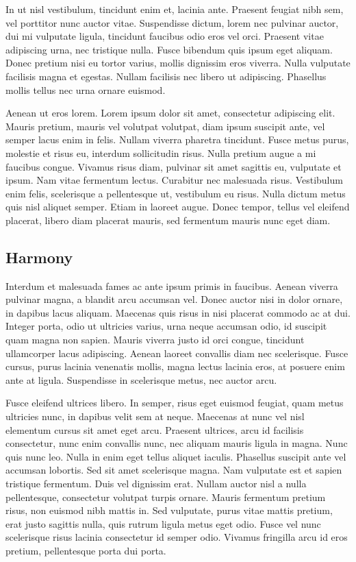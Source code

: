 \documentclass[11pt,a4paper]{memoir}\usepackage[]{graphicx}\usepackage[]{color}
\begin{document}
In ut nisl vestibulum, tincidunt enim et, lacinia ante. Praesent feugiat nibh sem, vel porttitor nunc auctor vitae. Suspendisse dictum, lorem nec pulvinar auctor, dui mi vulputate ligula, tincidunt faucibus odio eros vel orci. Praesent vitae adipiscing urna, nec tristique nulla. Fusce bibendum quis ipsum eget aliquam. Donec pretium nisi eu tortor varius, mollis dignissim eros viverra. Nulla vulputate facilisis magna et egestas. Nullam facilisis nec libero ut adipiscing. Phasellus mollis tellus nec urna ornare euismod.

Aenean ut eros lorem. Lorem ipsum dolor sit amet, consectetur adipiscing elit. Mauris pretium, mauris vel volutpat volutpat, diam ipsum suscipit ante, vel semper lacus enim in felis. Nullam viverra pharetra tincidunt. Fusce metus purus, molestie et risus eu, interdum sollicitudin risus. Nulla pretium augue a mi faucibus congue. Vivamus risus diam, pulvinar sit amet sagittis eu, vulputate et ipsum. Nam vitae fermentum lectus. Curabitur nec malesuada risus. Vestibulum enim felis, scelerisque a pellentesque ut, vestibulum eu risus. Nulla dictum metus quis nisl aliquet semper. Etiam in laoreet augue. Donec tempor, tellus vel eleifend placerat, libero diam placerat mauris, sed fermentum mauris nunc eget diam.

\subsection{Harmony}
Interdum et malesuada fames ac ante ipsum primis in faucibus. Aenean viverra pulvinar magna, a blandit arcu accumsan vel. Donec auctor nisi in dolor ornare, in dapibus lacus aliquam. Maecenas quis risus in nisi placerat commodo ac at dui. Integer porta, odio ut ultricies varius, urna neque accumsan odio, id suscipit quam magna non sapien. Mauris viverra justo id orci congue, tincidunt ullamcorper lacus adipiscing. Aenean laoreet convallis diam nec scelerisque. Fusce cursus, purus lacinia venenatis mollis, magna lectus lacinia eros, at posuere enim ante at ligula. Suspendisse in scelerisque metus, nec auctor arcu.

Fusce eleifend ultrices libero. In semper, risus eget euismod feugiat, quam metus ultricies nunc, in dapibus velit sem at neque. Maecenas at nunc vel nisl elementum cursus sit amet eget arcu. Praesent ultrices, arcu id facilisis consectetur, nunc enim convallis nunc, nec aliquam mauris ligula in magna. Nunc quis nunc leo. Nulla in enim eget tellus aliquet iaculis. Phasellus suscipit ante vel accumsan lobortis. Sed sit amet scelerisque magna. Nam vulputate est et sapien tristique fermentum. Duis vel dignissim erat. Nullam auctor nisl a nulla pellentesque, consectetur volutpat turpis ornare. Mauris fermentum pretium risus, non euismod nibh mattis in. Sed vulputate, purus vitae mattis pretium, erat justo sagittis nulla, quis rutrum ligula metus eget odio. Fusce vel nunc scelerisque risus lacinia consectetur id semper odio. Vivamus fringilla arcu id eros pretium, pellentesque porta dui porta.
\end{document}
